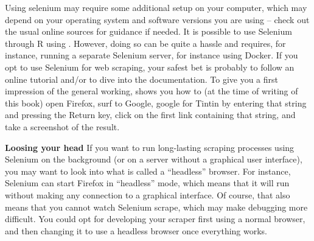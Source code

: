Using selenium may require some additional setup on your computer,
which may depend on your operating system and software versions you
are using -- check out the usual online sources for guidance if
needed.  It is possible to use Selenium through R using
. However, doing so can be quite a hassle and requires,
for instance, running a separate Selenium server, for instance using
Docker. If you opt to use Selenium for web scraping, your safest bet
is probably to follow an online tutorial and/or to dive into the
documentation. To give you a first impression of the general working,
 shows you how to (at the time of writing of this
book) open Firefox, surf to Google, google for Tintin by entering that
string and pressing the Return key, click on the first link containing
that string, and take a screenshot of the result.



\begin{feature}\textbf{Loosing your head}
If you want to run long-lasting scraping processes using Selenium on
the background (or on a server without a graphical user interface),
you may want to look into what is called a ``headless'' browser. For
instance, Selenium can start Firefox in ``headless'' mode, which means
that it will run without making any connection to a graphical
interface. Of course, that also means that you cannot watch Selenium
scrape, which may make debugging more difficult. You could opt for
developing your scraper first using a normal browser, and then
changing it to use a headless browser once everything works.
\end{feature}
